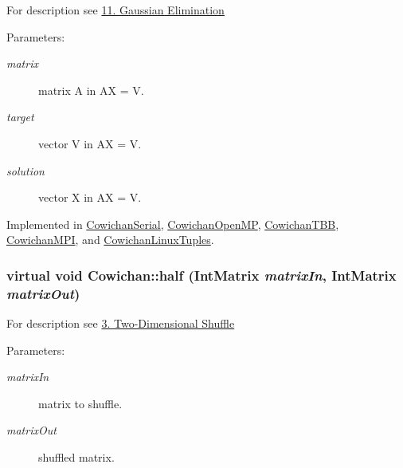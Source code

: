 For description see \hyperlink{index_gauss_sec}{11. Gaussian Elimination} \begin{Desc}
\item[Parameters:]
\begin{description}
\item[{\em matrix}]matrix A in AX = V. \item[{\em target}]vector V in AX = V. \item[{\em solution}]vector X in AX = V. \end{description}
\end{Desc}


Implemented in \hyperlink{class_cowichan_serial_b196d2384c2fe8b185e6269a050399eb}{CowichanSerial}, \hyperlink{class_cowichan_open_m_p_363bcd6f0c7b4d0fced94fe4cd59a267}{CowichanOpenMP}, \hyperlink{class_cowichan_t_b_b_d51868e0e65482f7c9e69d73b3904822}{CowichanTBB}, \hyperlink{class_cowichan_m_p_i_975f8da6c166fe1db3cf9341eeaab000}{CowichanMPI}, and \hyperlink{class_cowichan_linux_tuples_fd3e659afb38415f56fd508333b7bb1b}{CowichanLinuxTuples}.\hypertarget{class_cowichan_308603053675bccbe631f04af921f57c}{
\subsubsection[{half}]{\setlength{\rightskip}{0pt plus 5cm}virtual void Cowichan::half ({\bf IntMatrix} {\em matrixIn}, \/  {\bf IntMatrix} {\em matrixOut})}}
\label{class_cowichan_308603053675bccbe631f04af921f57c}


For description see \hyperlink{index_half_sec}{3. Two-Dimensional Shuffle} \begin{Desc}
\item[Parameters:]
\begin{description}
\item[{\em matrixIn}]matrix to shuffle. \item[{\em matrixOut}]shuffled matrix. \end{description}
\end{Desc}



